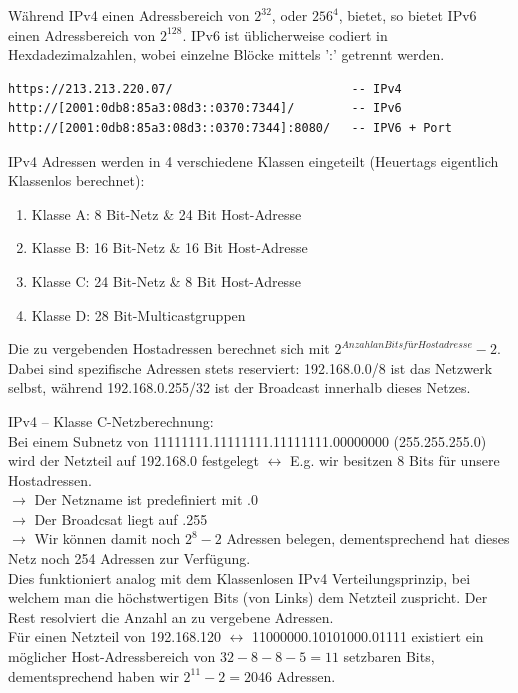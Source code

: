 \documentclass{scrartcl}
\begin{document}
\begin{enumerate}
    Während IPv4 einen Adressbereich von $2^{32}$, oder $256^{4}$, bietet, 
    so bietet IPv6 einen Adressbereich von $2^{128}$. 
    IPv6 ist üblicherweise codiert in Hexdadezimalzahlen, wobei einzelne Blöcke mittels ':' getrennt werden.
    
        \begin{verbatim}
https://213.213.220.07/                         -- IPv4
http://[2001:0db8:85a3:08d3::0370:7344]/        -- IPv6
http://[2001:0db8:85a3:08d3::0370:7344]:8080/   -- IPV6 + Port
        \end{verbatim}
        
        IPv4 Adressen werden in 4 verschiedene Klassen eingeteilt (Heuertags eigentlich Klassenlos berechnet):
        \begin{enumerate}
            \item Klasse A: 8 Bit-Netz \& 24 Bit Host-Adresse 
            \item Klasse B: 16 Bit-Netz \& 16 Bit Host-Adresse
            \item Klasse C: 24 Bit-Netz \& 8 Bit Host-Adresse
            \item Klasse D: 28 Bit-Multicastgruppen
    \end{enumerate}
        Die zu vergebenden Hostadressen berechnet sich mit $2^{Anzahl an Bits für Hostadresse} - 2$. 
        Dabei sind spezifische Adressen stets reserviert: 192.168.0.0/8 ist das Netzwerk selbst, 
        während 192.168.0.255/32 ist der Broadcast innerhalb dieses Netzes.
        
        IPv4 -- Klasse C-Netzberechnung:\\
        Bei einem Subnetz von 11111111.11111111.11111111.00000000 (255.255.255.0) wird der Netzteil auf 192.168.0 festgelegt $\leftrightarrow$ E.g. wir besitzen 8 Bits für unsere Hostadressen.\\
        $\rightarrow$ Der Netzname ist predefiniert mit .0\\
        $\rightarrow$ Der Broadcsat liegt auf .255\\
        $\rightarrow$ Wir können damit noch $2^8 - 2$ Adressen belegen, dementsprechend hat dieses Netz noch 254 Adressen zur Verfügung.\\
        
        Dies funktioniert analog mit dem Klassenlosen IPv4 Verteilungsprinzip, bei welchem man die höchstwertigen Bits (von Links) dem Netzteil zuspricht. Der Rest resolviert die Anzahl an zu vergebene Adressen.\\
        Für einen Netzteil von 192.168.120 $\leftrightarrow$ 11000000.10101000.01111 existiert ein möglicher Host-Adressbereich von $32-8-8-5 = 11$ setzbaren Bits, dementsprechend haben wir $2^11 - 2 = 2046$  Adressen. \\
        

\end{enumerate}
\end{document}
